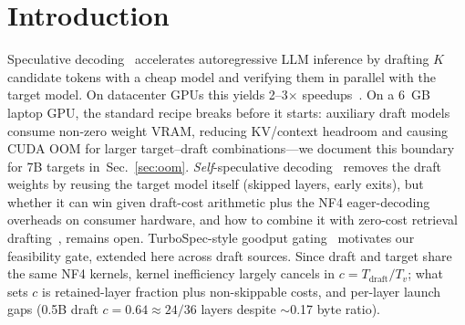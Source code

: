 \documentclass[10pt,twocolumn,letterpaper]{article}
\begin{document}
\section{Introduction}
\label{sec:intro}

Speculative decoding~\cite{leviathan2023fast,chen2023accelerating} accelerates autoregressive LLM inference by drafting $K$ candidate tokens with a cheap model and verifying them in parallel with the target model. On datacenter GPUs this yields 2--3$\times$ speedups~\cite{cai2024medusa,li2024eagle}. On a 6~GB laptop GPU, the standard recipe breaks before it starts: auxiliary draft models consume non-zero weight VRAM, reducing KV/context headroom and causing CUDA OOM for larger target--draft combinations---we document this boundary for 7B targets in~Sec.~\ref{sec:oom}. \textit{Self}-speculative decoding~\cite{zhang2024draft,elhoushi2024layerskip,liu2024kangaroo} removes the draft weights by reusing the target model itself (skipped layers, early exits), but whether it can win given draft-cost arithmetic plus the NF4 eager-decoding overheads on consumer hardware, and how to combine it with zero-cost retrieval drafting~\cite{saxena2024prompt,he2024rest}, remains open. TurboSpec-style goodput gating~\cite{turbospec2025} motivates our feasibility gate, extended here across draft sources. Since draft and target share the same NF4 kernels, kernel inefficiency largely cancels in $c{=}T_{\mathrm{draft}}/T_v$; what sets $c$ is retained-layer fraction plus non-skippable costs, and per-layer launch gaps (0.5B draft $c{=}0.64{\approx}24/36$ layers despite $\sim$0.17 byte ratio).
\end{document}
